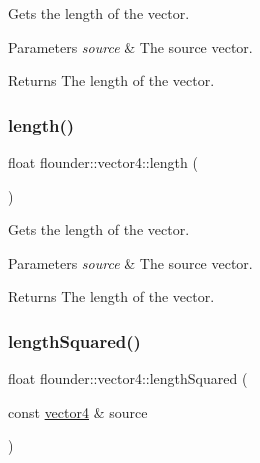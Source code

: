 Gets the length of the vector. 


\begin{DoxyParams}{Parameters}
{\em source} & The source vector. \\
\hline
\end{DoxyParams}
\begin{DoxyReturn}{Returns}
The length of the vector. 
\end{DoxyReturn}
\mbox{\label{classflounder_1_1vector4_ad21f01ec6397b385f7aef3335726fb25}} 
\subsubsection{\texorpdfstring{length()}{length()}\hspace{0.1cm}{\footnotesize\ttfamily [2/2]}}
{\footnotesize\ttfamily float flounder\+::vector4\+::length (\begin{DoxyParamCaption}{ }\end{DoxyParamCaption})}



Gets the length of the vector. 


\begin{DoxyParams}{Parameters}
{\em source} & The source vector. \\
\hline
\end{DoxyParams}
\begin{DoxyReturn}{Returns}
The length of the vector. 
\end{DoxyReturn}
\mbox{\label{classflounder_1_1vector4_a39b1fe0dc549e692807b92b757c5fb95}} 
\subsubsection{\texorpdfstring{length\+Squared()}{lengthSquared()}\hspace{0.1cm}{\footnotesize\ttfamily [1/2]}}
{\footnotesize\ttfamily float flounder\+::vector4\+::length\+Squared (\begin{DoxyParamCaption}\item[{const \hyperlink{classflounder_1_1vector4}{vector4} \&}]{source }\end{DoxyParamCaption})\hspace{0.3cm}{\ttfamily [static]}}



